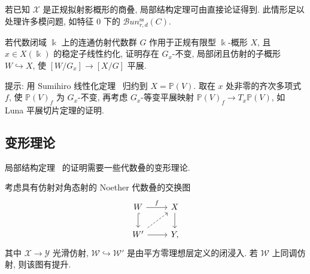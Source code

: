 若已知 $\mathcal X$ 是正规拟射影概形的商叠, 局部结构定理可由直接论证得到. 此情形足以处理许多模问题, 如特征 $0$ 下的 $\mathcal B\!un_{r,d}^{\mathrm{ss}}(C)$.
\begin{exercise}\label{src:7.7.11}
若代数闭域 $\Bbbk$ 上的连通仿射代数群 $G$ 作用于正规有限型 $\Bbbk$-概形 $X$, 且 $x\in X(\Bbbk)$ 的稳定子线性约化, 证明存在 $G_x$-不变, 局部闭且仿射的子概形 $W\hookrightarrow X$, 使 $[W/G_x]\to[X/G]$ 平展.

提示: 用 Sumihiro 线性化定理~ 归约到 $X=\mathbb P(V)$. 取在 $x$ 处非零的齐次多项式 $f$, 使 $\mathbb P(V)_f$ 为 $G_x$-不变, 再考虑 $G_x$-等变平展映射 $\mathbb P(V)_f\to T_x\mathbb P(V)$, 如 Luna 平展切片定理的证明.
\end{exercise}

\subsection{变形理论}\label{src:7.7.2-subsection}
局部结构定理~ 的证明需要一些代数叠的变形理论.
\begin{proposition}\label{src:7.7.12}
考虑具有仿射对角态射的 Noether 代数叠的交换图
\begin{align*}
\begin{tikzcd}[ampersand replacement=\&]
\mathcal W\arrow[r,"{f}"]\arrow[d,hook]\&\mathcal X\arrow[d]\\
\mathcal W'\arrow[r]\arrow[ur,dashed]\&\mathcal Y,
\end{tikzcd}
\end{align*}
其中 $\mathcal X\to\mathcal Y$ 光滑仿射, $\mathcal W\hookrightarrow\mathcal W'$ 是由平方零理想层定义的闭浸入. 若 $\mathcal W$ 上同调仿射, 则该图有提升.
\end{proposition}

